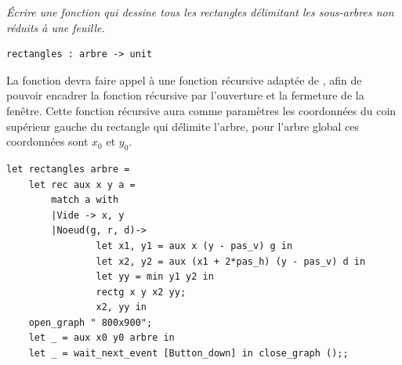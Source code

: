 \begin{minipage}{0.5\textwidth}
\begin{Exercise}\it 
Écrire une fonction  qui dessine tous les rectangles délimitant les sous-arbres non réduits à une feuille.
\end{Exercise}
\medskip
\begin{lstlisting}
rectangles : arbre -> unit
\end{lstlisting}
La fonction devra faire appel à une fonction récursive adaptée de , afin de pouvoir encadrer la fonction récursive par l'ouverture et la fermeture de la fenêtre. Cette fonction récursive aura comme paramètres les coordonnées du coin supérieur gauche du rectangle qui délimite l'arbre, pour l'arbre global ces coordonnées sont $x_0$ et $y_0$.
\end{minipage}
\begin{minipage}{0.5\textwidth}
\begin{center}
\end{center}
\end{minipage}
\begin{Answer}
\begin{lstlisting}
let rectangles arbre =
    let rec aux x y a =
        match a with
        |Vide -> x, y
        |Noeud(g, r, d)-> 
                let x1, y1 = aux x (y - pas_v) g in
                let x2, y2 = aux (x1 + 2*pas_h) (y - pas_v) d in
                let yy = min y1 y2 in
                rectg x y x2 yy;
                x2, yy in
    open_graph " 800x900";
    let _ = aux x0 y0 arbre in
    let _ = wait_next_event [Button_down] in close_graph ();;
\end{lstlisting}

\newpage
\end{Answer}
